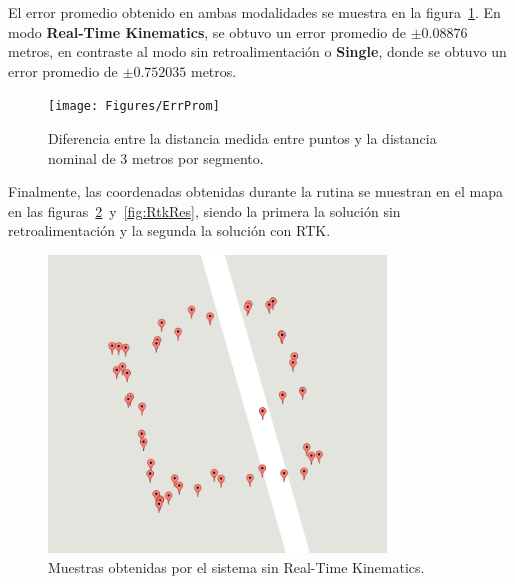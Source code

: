 El error promedio obtenido en ambas modalidades se muestra en la figura~\ref{fig:ErrProm}. En modo \textbf{Real-Time Kinematics}, se obtuvo un error promedio de \textbf{$\pm 0.08876$} metros, en contraste al modo sin retroalimentación o \textbf{Single}, donde se obtuvo un error promedio de \textbf{$\pm 0.752035$} metros.

\begin{figure}[H]
\centering
\texttt{[image: Figures/ErrProm]}
\caption[Diferencia entre la distancia medida entre puntos y la distancia nominal de 3 metros por segmento.]{Diferencia entre la distancia medida entre puntos y la distancia nominal de 3 metros por segmento.}
\label{fig:ErrProm}
\end{figure}

Finalmente, las coordenadas obtenidas durante la rutina se muestran en el mapa en las figuras~\ref{fig:NoRtkRes}~y~\ref{fig:RtkRes}, siendo la primera la solución sin retroalimentación y la segunda la solución con RTK.

\begin{figure}[H]
\centering
\includegraphics[width=0.8\textwidth]{Figures/NoRtkRes}
\caption[Muestras obtenidas sin Real-Time Kinematics.]{Muestras obtenidas por el sistema sin Real-Time Kinematics.}
\label{fig:NoRtkRes}
\end{figure}

